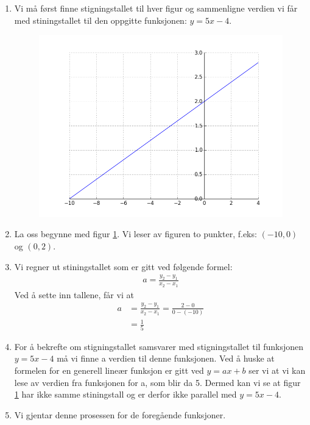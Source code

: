 \documentclass[12pt,twoside,onecolumn]{article}
\begin{document}
\begin{Exercise}
\begin{enumerate}
\item Vi må først finne stigningstallet til hver figur og sammenligne verdien vi får med stiningstallet til den oppgitte funksjonen: $y = 5x - 4$. 
\begin{figure}[h!]
    \label{fig:xd5p2}
    \centering
    \includegraphics[scale = 0.4]{figures/xd5p2.png}
\end{figure}
\item La oss begynne med figur \ref{fig:xd5p2}. Vi leser av figuren to punkter, f.eks: $(-10,0)$ og  $(0,2)$.
\item Vi regner ut stiningstallet som er gitt ved følgende formel: 
\begin{align}
a = \frac{y_2 - y_1}{x_2 - x_1}
\end{align} 
Ved å sette inn tallene, får vi at
\begin{align}
a &= \frac{y_2 - y_1}{x_2 - x_1} = \frac{2 - 0}{0 - (-10)}\\
  &= \frac{1}{5}
\end{align} 
\item For å bekrefte om stigningstallet samsvarer med stigningstallet til funksjonen $y = 5x - 4$ må vi finne a verdien til denne funksjonen. Ved å huske at formelen for en generell lineær funksjon er gitt ved $y = ax + b$ ser vi at vi kan lese av verdien fra funksjonen for a, som blir da 5. Dermed kan vi se at figur \ref{fig:xd5p2} har ikke samme stiningstall og er derfor ikke parallel med $y = 5x - 4$.
\item Vi gjentar denne prosessen for de foregående funksjoner. 
\end{enumerate}
\end{Exercise}
\end{document}
